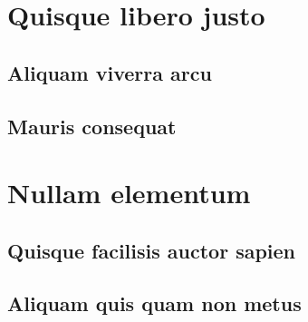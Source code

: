 \documentclass[
	12pt,				%
    oneside,            %
	a4paper,			%
	english,			%
	brazilian,		    %
	]{AcademicoUFT}
\begin{document}
\begin{apendicesenv}
\partapendices %

\chapter{Quisque libero justo}

\section{Aliquam viverra arcu}
\lipsum[8-9] %

\section{Mauris consequat}
\lipsum[24] %


\chapter{Nullam elementum}

\section{Quisque facilisis auctor sapien}
\lipsum[80-81] %

\section{Aliquam quis quam non metus}
\lipsum[34] %

\end{apendicesenv}
\end{document}
